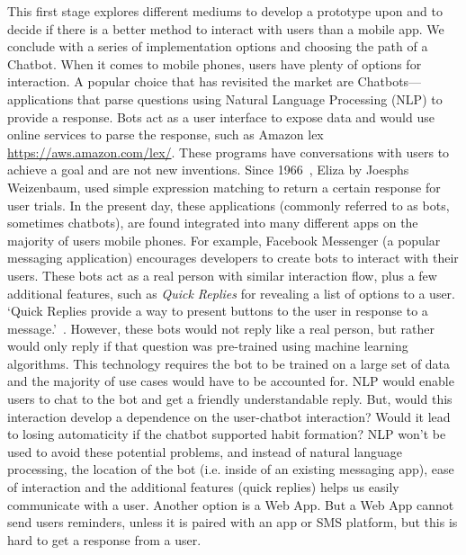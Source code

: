 This first stage explores different mediums to develop a prototype upon and to decide if there is a better method to interact with users than a mobile app. We conclude with a series of implementation options and choosing the path of a Chatbot.\newline
\newline
When it comes to mobile phones, users have plenty of options for interaction. A popular choice that has revisited the market are Chatbots---applications that parse questions using Natural Language Processing (NLP) to provide a response. Bots act as a user interface to expose data and would use online services to parse the response, such as Amazon lex \url{https://aws.amazon.com/lex/}. These programs have conversations with users to achieve a goal and are not new inventions. Since 1966~\cite{article_eliza}, Eliza by Joesphs Weizenbaum, used simple expression matching to return a certain response for user trials. In the present day, these applications (commonly referred to as bots, sometimes chatbots), are found integrated into many different apps on the majority of users mobile phones. For example, Facebook Messenger (a popular messaging application) encourages developers to create bots to interact with their users. These bots act as a real person with similar interaction flow, plus a few additional features, such as \textit{Quick Replies} for revealing a list of options to a user. `Quick Replies provide a way to present buttons to the user in response to a message.'~\cite{doc_fb_quick_replies}. However, these bots would not reply like a real person, but rather would only reply if that question was pre-trained using machine learning algorithms. This technology requires the bot to be trained on a large set of data and the majority of use cases would have to be accounted for.\newline
\newline
NLP would enable users to chat to the bot and get a friendly understandable reply. But, would this interaction develop a dependence on the user-chatbot interaction? Would it lead to losing automaticity if the chatbot supported habit formation? NLP won't be used to avoid these potential problems, and instead of natural language processing, the location of the bot (i.e. inside of an existing messaging app), ease of interaction and the additional features (quick replies) helps us easily communicate with a user.\newline
\newline
Another option is a Web App. But a Web App cannot send users reminders, unless it is paired with an app or SMS platform, but this is hard to get a response from a user.\newline
